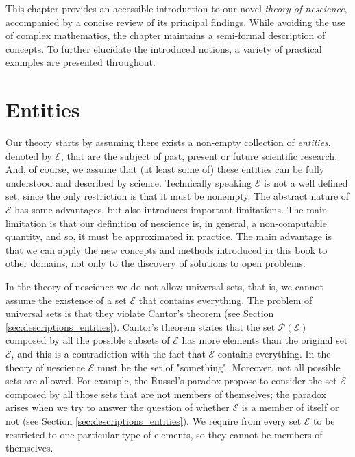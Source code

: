 This chapter provides an accessible introduction to our novel \emph{theory of nescience}, accompanied by a concise review of its principal findings. While avoiding the use of complex mathematics, the chapter maintains a semi-formal description of concepts. To further elucidate the introduced notions, a variety of practical examples are presented throughout.

%
%

\section{Entities}

Our theory starts by assuming there exists a non-empty collection of \emph{entities}, denoted by $\mathcal{E}$, that are the subject of past, present or future scientific research. And, of course, we assume that (at least some of) these entities can be fully understood and described by science. Technically speaking $\mathcal{E}$ is not a well defined set, since the only restriction is that it must be nonempty. The abstract nature of $\mathcal{E}$ has some advantages, but also introduces important limitations. The main limitation is that our definition of nescience is, in general, a non-computable quantity, and so, it must be approximated in practice. The main advantage is that we can apply the new concepts and methods introduced in this book to other domains, not only to the discovery of solutions to open problems.

In the theory of nescience we do not allow universal sets, that is, we cannot assume the existence of a set $\mathcal{E}$ that contains everything. The problem of universal sets is that they violate Cantor's theorem (see Section \ref{sec:descriptions_entities}). Cantor's theorem states that the set $\mathcal{P}(\mathcal{E})$ composed by all the possible subsets of $\mathcal{E}$ has more elements than the original set $\mathcal{E}$, and this is a contradiction with the fact that $\mathcal{E}$ contains everything. In the theory of nescience $\mathcal{E}$ must be the set of "something". Moreover, not all possible sets are allowed. For example, the Russel's paradox propose to consider the set $\mathcal{E}$ composed by all those sets that are not members of themselves; the paradox arises when we try to answer the question of whether $\mathcal{E}$ is a member of itself or not (see Section \ref{sec:descriptions_entities}). We require from every set $\mathcal{E}$ to be restricted to one particular type of elements, so they cannot be members of themselves.

